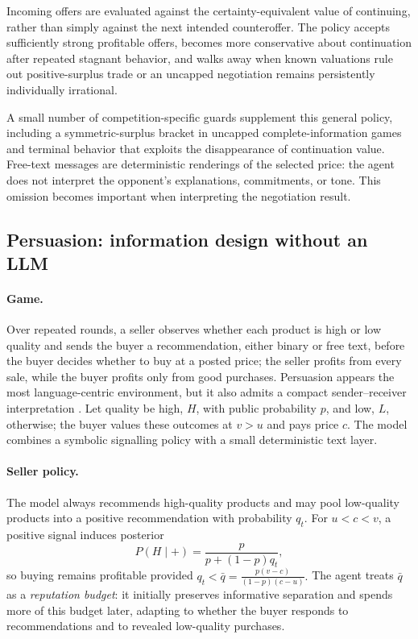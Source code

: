 \documentclass{article}
\begin{document}
Incoming offers are evaluated against the certainty-equivalent value of continuing, rather than simply against the next intended counteroffer.
The policy accepts sufficiently strong profitable offers, becomes more conservative about continuation after repeated stagnant behavior, and walks away when known valuations rule out positive-surplus trade or an uncapped negotiation remains persistently individually irrational.

A small number of competition-specific guards supplement this general policy, including a symmetric-surplus bracket in uncapped complete-information games and terminal behavior that exploits the disappearance of continuation value.
Free-text messages are deterministic renderings of the selected price: the agent does not interpret the opponent's explanations, commitments, or tone.
This omission becomes important when interpreting the negotiation result.

\subsection{Persuasion: information design without an LLM}

\paragraph{Game.}
Over repeated rounds, a seller observes whether each product is high or low quality and sends the buyer a recommendation, either binary or free text, before the buyer decides whether to buy at a posted price; the seller profits from every sale, while the buyer profits only from good purchases.
Persuasion appears the most language-centric environment, but it also admits a compact sender--receiver interpretation \citep{kamenica2011bayesian,crawford1982strategic}.
Let quality be high, $H$, with public probability $p$, and low, $L$, otherwise; the buyer values these outcomes at $v>u$ and pays price $c$.
The model combines a symbolic signalling policy with a small deterministic text layer.

\paragraph{Seller policy.}
The model always recommends high-quality products and may pool low-quality products into a positive recommendation with probability $q_t$.
For $u<c<v$, a positive signal induces posterior
\[
    P(H\mid+)=\frac{p}{p+(1-p)q_t},
\]
so buying remains profitable provided
\(
    q_t < \bar q
    = \frac{p(v-c)}{(1-p)(c-u)}.
    \label{eq:pooling-cap}
\)
The agent treats $\bar q$ as a \emph{reputation budget}: it initially preserves informative separation and spends more of this budget later, adapting to whether the buyer responds to recommendations and to revealed low-quality purchases.
\end{document}
